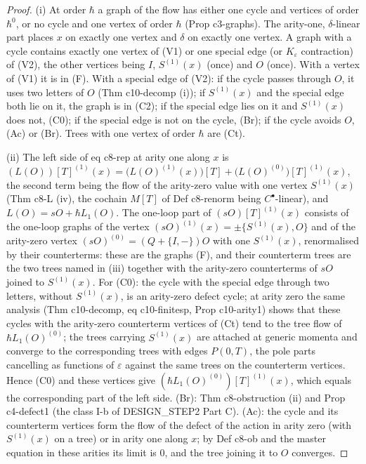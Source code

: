 \begin{proof}
(i) At order $\hbar$ a graph of the flow has either one cycle and vertices of order $\hbar^0$, or no cycle and one vertex of order $\hbar$ (Prop c3-graphs). The arity-one, $\delta$-linear part places $x$ on exactly one vertex and $\delta$ on exactly one vertex. A graph with a cycle contains exactly one vertex of (V1) or one special edge (or $K_\varepsilon$ contraction) of (V2), the other vertices being $I$, $S^{(1)}(x)$ (once) and $O$ (once). With a vertex of (V1) it is in (F). With a special edge of (V2): if the cycle passes through $O$, it uses two letters of $O$ (Thm c10-decomp (i)); if $S^{(1)}(x)$ and the special edge both lie on it, the graph is in (C2); if the special edge lies on it and $S^{(1)}(x)$ does not, (C0); if the special edge is not on the cycle, (Br); if the cycle avoids $O$, (Ac) or (Br). Trees with one vertex of order $\hbar$ are (Ct).

(ii) The left side of eq c8-rep at arity one along $x$ is $(L(O))[T]^{(1)}(x)=\big(L(O)^{(1)}(x)\big)[T]+\big(L(O)^{(0)}\big)[T]^{(1)}(x)$, the second term being the flow of the arity-zero value with one vertex $S^{(1)}(x)$ (Thm c8-L (iv), the cochain $M[T]$ of Def c8-renorm being $C^\bullet$-linear), and $L(O)=sO+\hbar L_1(O)$. The one-loop part of $(sO)[T]^{(1)}(x)$ consists of the one-loop graphs of the vertex $(sO)^{(1)}(x)=\pm\{S^{(1)}(x),O\}$ and of the arity-zero vertex $(sO)^{(0)}=(Q+\{I,-\})O$ with one $S^{(1)}(x)$, renormalised by their counterterms: these are the graphs (F), and their counterterm trees are the two trees named in (iii) together with the arity-zero counterterms of $sO$ joined to $S^{(1)}(x)$. For (C0): the cycle with the special edge through two letters, without $S^{(1)}(x)$, is an arity-zero defect cycle; at arity zero the same analysis (Thm c10-decomp, eq c10-finitesp, Prop c10-arity1) shows that these cycles with the arity-zero counterterm vertices of (Ct) tend to the tree flow of $\hbar L_1(O)^{(0)}$; the trees carrying $S^{(1)}(x)$ are attached at generic momenta and converge to the corresponding trees with edges $P(0,T)$, the pole parts cancelling as functions of $\varepsilon$ against the same trees on the counterterm vertices. Hence (C0) and these vertices give $(\hbar L_1(O)^{(0)})[T]^{(1)}(x)$, which equals the corresponding part of the left side. (Br): Thm c8-obstruction (ii) and Prop c4-defect1 (the class I-b of DESIGN\_STEP2 Part C). (Ac): the cycle and its counterterm vertices form the flow of the defect of the action in arity zero (with $S^{(1)}(x)$ on a tree) or in arity one along $x$; by Def c8-ob and the master equation in these arities its limit is $0$, and the tree joining it to $O$ converges.


\end{proof}
